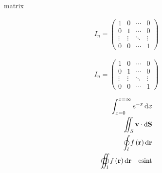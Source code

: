 \documentclass[../presentatie.tex]{subfiles}
\begin{document}
\begin{saveblock}{matrix}
	\begin{highlightblock}[gobble=8,linewidth=\textwidth,framexleftmargin=0.25em]
		\begin{align*}
			I_n = \begin{pmatrix}
				1 & 0 & \cdots & 0\\
				0 & 1 & \cdots & 0\\
				\vdots & \vdots & \ddots & \vdots\\
				0 & 0 & \cdots & 1
			\end{pmatrix}
		\end{align*}
	\end{highlightblock}
\end{saveblock}

\begin{frame}

	\begin{align*}
		I_n = \begin{pmatrix}
			1 & 0 & \cdots & 0\\
			0 & 1 & \cdots & 0\\
			\vdots & \vdots & \ddots & \vdots\\
			0 & 0 & \cdots & 1
		\end{pmatrix}
	\end{align*}
\end{frame}	


\begin{frame}
	
	\begin{align*}
		\int_{x=0}^{x=\infty}e^{-x}\dif x\\
		\iint_{S}\textbf{v}\cdot\dif \textbf{S}\\
		\oint_{l}f\left(\textbf{r}\right)\dif\textbf{r}\\
		\oiint_{l}f\left(\textbf{r}\right)\dif\textbf{r}\quad \mbox{esint}
	\end{align*}
\end{frame}
\end{document}

